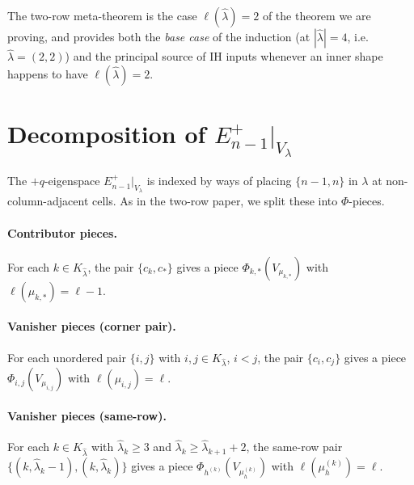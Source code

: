 \documentclass[11pt]{article}
\theoremstyle{definition}
\newcommand{\Vlam}{V_\lambda}
\newcommand{\hatl}{\widehat\lambda}
\newcommand{\elh}{\ell(\hatl)}
\begin{document}
The two-row meta-theorem is the case $\elh = 2$ of the theorem we are
proving, and provides both the \emph{base case} of the induction (at
$|\hatl| = 4$, i.e.\ $\hatl = (2, 2)$) and the principal source of IH
inputs whenever an inner shape happens to have $\elh = 2$.

\section{Decomposition of $E^+_{n-1}|_{\Vlam}$}\label{sec:Eplus}

The $+q$-eigenspace $E_{n-1}^+|_{\Vlam}$ is indexed by ways of placing
$\{n-1, n\}$ in $\lambda$ at non-column-adjacent cells.  As in the
two-row paper, we split these into $\Phi$-pieces.

\paragraph{Contributor pieces.}  For each $k \in K_{\hatl}$, the pair
$\{c_k, c_*\}$ gives a piece $\Phi_{k,*}(V_{\mu_{k,*}})$ with
$\ell(\mu_{k,*}) = \ell - 1$.

\paragraph{Vanisher pieces (corner pair).}  For each unordered pair
$\{i, j\}$ with $i, j \in K_{\hatl}$, $i < j$, the pair $\{c_i, c_j\}$
gives a piece $\Phi_{i,j}(V_{\mu_{i,j}})$ with $\ell(\mu_{i,j}) = \ell$.

\paragraph{Vanisher pieces (same-row).}  For each $k \in K_{\hatl}$
with $\hatl_k \ge 3$ and $\hatl_k \ge \hatl_{k+1} + 2$, the same-row
pair $\{(k, \hatl_k - 1), (k, \hatl_k)\}$ gives a piece
$\Phi_{h^{(k)}}(V_{\mu_h^{(k)}})$ with $\ell(\mu_h^{(k)}) = \ell$.
\end{document}
